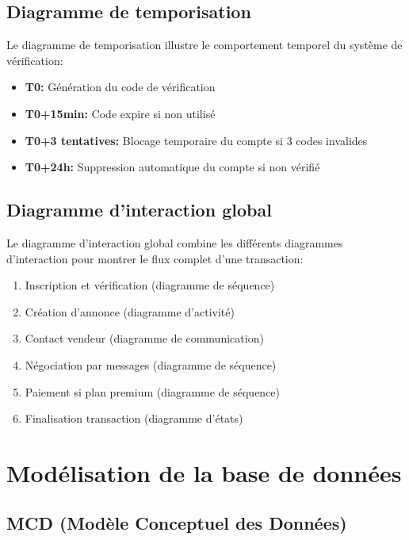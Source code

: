 \subsection{Diagramme de temporisation}

Le diagramme de temporisation illustre le comportement temporel du système de vérification:

\begin{itemize}
    \item \textbf{T0:} Génération du code de vérification
    \item \textbf{T0+15min:} Code expire si non utilisé
    \item \textbf{T0+3 tentatives:} Blocage temporaire du compte si 3 codes invalides
    \item \textbf{T0+24h:} Suppression automatique du compte si non vérifié
\end{itemize}

\subsection{Diagramme d'interaction global}

Le diagramme d'interaction global combine les différents diagrammes d'interaction pour montrer le flux complet d'une transaction:

\begin{enumerate}
    \item Inscription et vérification (diagramme de séquence)
    \item Création d'annonce (diagramme d'activité)
    \item Contact vendeur (diagramme de communication)
    \item Négociation par messages (diagramme de séquence)
    \item Paiement si plan premium (diagramme de séquence)
    \item Finalisation transaction (diagramme d'états)
\end{enumerate}

\section{Modélisation de la base de données}

\subsection{MCD (Modèle Conceptuel des Données)}

